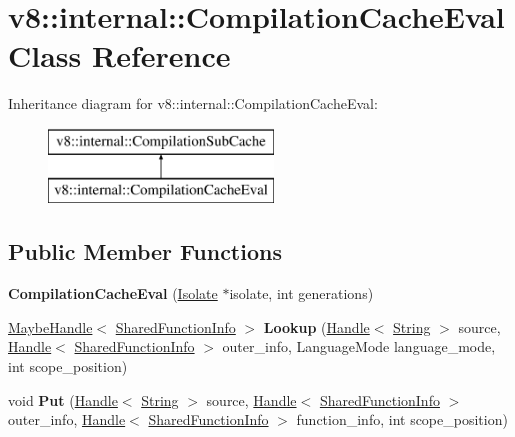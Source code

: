 \hypertarget{classv8_1_1internal_1_1_compilation_cache_eval}{}\section{v8\+:\+:internal\+:\+:Compilation\+Cache\+Eval Class Reference}
\label{classv8_1_1internal_1_1_compilation_cache_eval}
Inheritance diagram for v8\+:\+:internal\+:\+:Compilation\+Cache\+Eval\+:\begin{figure}[H]
\begin{center}
\leavevmode
\includegraphics[height=2.000000cm]{classv8_1_1internal_1_1_compilation_cache_eval}
\end{center}
\end{figure}
\subsection*{Public Member Functions}
\begin{DoxyCompactItemize}
\item 
{\bfseries Compilation\+Cache\+Eval} (\hyperlink{classv8_1_1internal_1_1_isolate}{Isolate} $\ast$isolate, int generations)\hypertarget{classv8_1_1internal_1_1_compilation_cache_eval_a992bb47844f5dd0372ef595c20fabbf9}{}\label{classv8_1_1internal_1_1_compilation_cache_eval_a992bb47844f5dd0372ef595c20fabbf9}

\item 
\hyperlink{classv8_1_1internal_1_1_maybe_handle}{Maybe\+Handle}$<$ \hyperlink{classv8_1_1internal_1_1_shared_function_info}{Shared\+Function\+Info} $>$ {\bfseries Lookup} (\hyperlink{classv8_1_1internal_1_1_handle}{Handle}$<$ \hyperlink{classv8_1_1internal_1_1_string}{String} $>$ source, \hyperlink{classv8_1_1internal_1_1_handle}{Handle}$<$ \hyperlink{classv8_1_1internal_1_1_shared_function_info}{Shared\+Function\+Info} $>$ outer\+\_\+info, Language\+Mode language\+\_\+mode, int scope\+\_\+position)\hypertarget{classv8_1_1internal_1_1_compilation_cache_eval_ac8164b2bb616c5e2ec6f2ce064ffd048}{}\label{classv8_1_1internal_1_1_compilation_cache_eval_ac8164b2bb616c5e2ec6f2ce064ffd048}

\item 
void {\bfseries Put} (\hyperlink{classv8_1_1internal_1_1_handle}{Handle}$<$ \hyperlink{classv8_1_1internal_1_1_string}{String} $>$ source, \hyperlink{classv8_1_1internal_1_1_handle}{Handle}$<$ \hyperlink{classv8_1_1internal_1_1_shared_function_info}{Shared\+Function\+Info} $>$ outer\+\_\+info, \hyperlink{classv8_1_1internal_1_1_handle}{Handle}$<$ \hyperlink{classv8_1_1internal_1_1_shared_function_info}{Shared\+Function\+Info} $>$ function\+\_\+info, int scope\+\_\+position)\hypertarget{classv8_1_1internal_1_1_compilation_cache_eval_a9617237fe461de512f54ff9708edca70}{}\label{classv8_1_1internal_1_1_compilation_cache_eval_a9617237fe461de512f54ff9708edca70}

\end{DoxyCompactItemize}
